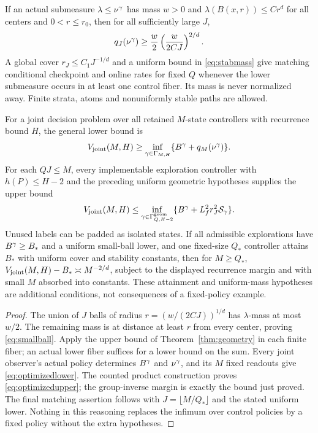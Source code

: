 \begin{corollary}\label{cor:matching}
If an actual submeasure $\lambda\le\nu^\gamma$ has mass $w>0$ and
$\lambda(B(x,r))\le Cr^d$ for all centers and $0<r\le r_0$, then for all sufficiently large $J$,
\begin{equation}\label{eq:smallball}
 q_J(\nu^\gamma)\ge {w\over2}\left({w\over2CJ}\right)^{2/d}.
\end{equation}
A global cover $r_J\le C_1J^{-1/d}$ and a uniform bound in \eqref{eq:stabmass} give matching conditional checkpoint and online rates for fixed $Q$ whenever the lower submeasure occurs in at least one control fiber. Its mass is never normalized away. Finite strata, atoms and nonuniformly stable paths are allowed.

For a joint decision problem over all retained $M$-state controllers with recurrence bound $H$, the general lower bound is
\begin{equation}\label{eq:optimizedlower}
 V_{\rm joint}(M,H)\ge
 \inf_{\gamma\in\Gamma_{M,H}}\{B^\gamma+q_M(\nu^\gamma)\}.
\end{equation}
For each $QJ\le M$, every implementable exploration controller with $h(P)\le H-2$ and the preceding uniform geometric hypotheses supplies the upper bound
\begin{equation}\label{eq:optimizedupper}
 V_{\rm joint}(M,H)\le
 \inf_{\gamma\in\Gamma_{Q,H-2}^{\rm geom}}
       \{B^\gamma+L_f^2r_J^2\mathcal S_\gamma\}.
\end{equation}
Unused labels can be padded as isolated states. If all admissible explorations have $B^\gamma\ge B_*$ and a uniform small-ball lower, and one fixed-size $Q_*$ controller attains $B_*$ with uniform cover and stability constants, then for $M\ge Q_*$,
$V_{\rm joint}(M,H)-B_*\asymp M^{-2/d}$, subject to the displayed recurrence margin and with small $M$ absorbed into constants. These attainment and uniform-mass hypotheses are additional conditions, not consequences of a fixed-policy example.
\end{corollary}
\begin{proof}
The union of $J$ balls of radius $r=(w/(2CJ))^{1/d}$ has $\lambda$-mass at most $w/2$. The remaining mass is at distance at least $r$ from every center, proving \eqref{eq:smallball}. Apply the upper bound of Theorem~\ref{thm:geometry} in each finite fiber; an actual lower fiber suffices for a lower bound on the sum. Every joint observer's actual policy determines $B^\gamma$ and $\nu^\gamma$, and its $M$ fixed readouts give \eqref{eq:optimizedlower}. The counted product construction proves \eqref{eq:optimizedupper}; the group-inverse margin is exactly the bound just proved. The final matching assertion follows with $J=\lfloor M/Q_*\rfloor$ and the stated uniform lower. Nothing in this reasoning replaces the infimum over control policies by a fixed policy without the extra hypotheses.
\end{proof}

